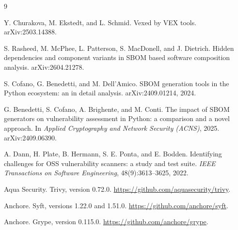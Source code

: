 \documentclass[sigconf,nonacm]{acmart}
\begin{document}

\begin{thebibliography}{9}

Y. Churakova, M. Ekstedt, and L. Schmid.
\newblock Vexed by VEX tools.
\newblock arXiv:2503.14388.

S. Rasheed, M. McPhee, L. Patterson, S. MacDonell, and J. Dietrich.
\newblock Hidden dependencies and component variants in SBOM based software
composition analysis.
\newblock arXiv:2604.21278.

S. Cofano, G. Benedetti, and M. Dell'Amico.
\newblock SBOM generation tools in the Python ecosystem: an in detail analysis.
\newblock arXiv:2409.01214, 2024.

G. Benedetti, S. Cofano, A. Brighente, and M. Conti.
\newblock The impact of SBOM generators on vulnerability assessment in Python:
a comparison and a novel approach.
\newblock In \emph{Applied Cryptography and Network Security (ACNS)}, 2025.
arXiv:2409.06390.

A. Dann, H. Plate, B. Hermann, S. E. Ponta, and E. Bodden.
\newblock Identifying challenges for OSS vulnerability scanners: a study and
test suite.
\newblock \emph{IEEE Transactions on Software Engineering}, 48(9):3613--3625,
2022.

Aqua Security.
\newblock Trivy, version 0.72.0.
\newblock \url{https://github.com/aquasecurity/trivy}.

Anchore.
\newblock Syft, versions 1.22.0 and 1.51.0.
\newblock \url{https://github.com/anchore/syft}.

Anchore.
\newblock Grype, version 0.115.0.
\newblock \url{https://github.com/anchore/grype}.

\end{thebibliography}
\end{document}
